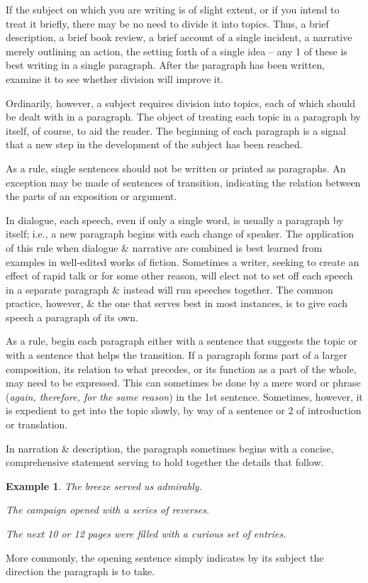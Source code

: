 \documentclass[oneside]{book}
\numberwithin{equation}{section}
\newtheorem{example}{Example}[chapter]
\begin{document}
If the subject on which you are writing is of slight extent, or if you intend to treat it briefly, there may be no need to divide it into topics. Thus, a brief description, a brief book review, a brief account of a single incident, a narrative merely outlining an action, the setting forth of a single idea -- any 1 of these is best writing in a single paragraph. After the paragraph has been written, examine it to see whether division will improve it.

Ordinarily, however, a subject requires division into topics, each of which should be dealt with in a paragraph. The object of treating each topic in a paragraph by itself, of course, to aid the reader. The beginning of each paragraph is a signal that a new step in the development of the subject has been reached.

As a rule, single sentences should not be written or printed as paragraphs. An exception may be made of sentences of transition, indicating the relation between the parts of an exposition or argument.

In dialogue, each speech, even if only a single word, is usually a paragraph by itself; i.e., a new paragraph begins with each change of speaker. The application of this rule when dialogue \& narrative are combined is best learned from examples in well-edited works of fiction. Sometimes a writer, seeking to create an effect of rapid talk or for some other reason, will elect not to set off each speech in a separate paragraph \& instead will run speeches together. The common practice, however, \& the one that serves best in most instances, is to give each speech a paragraph of its own.

As a rule, begin each paragraph either with a sentence that suggests the topic or with a sentence that helps the transition. If a paragraph forms part of a larger composition, its relation to what precedes, or its function as a part of the whole, may need to be expressed. This can sometimes be done by a mere word or phrase (\textit{again, therefore, for the same reason}) in the 1st sentence. Sometimes, however, it is expedient to get into the topic slowly, by way of a sentence or 2 of introduction or translation.

In narration \& description, the paragraph sometimes begins with a concise, comprehensive statement serving to hold together the details that follow.

\begin{example}
	The breeze served us admirably.
	
	The campaign opened with a series of reverses.
	
	The next 10 or 12 pages were filled with a curious set of entries.
\end{example}
 More commonly, the opening sentence simply indicates by its subject the direction the paragraph is to take.
\end{document}
